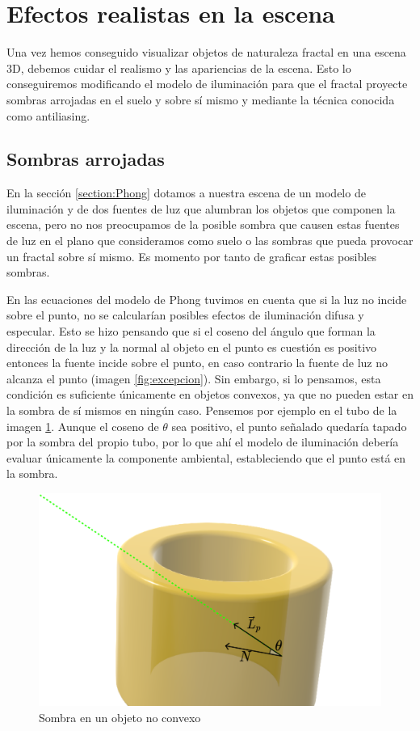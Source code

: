 \section{Efectos realistas en la escena}

Una vez hemos conseguido visualizar objetos de naturaleza fractal en una escena 3D, debemos cuidar el realismo y las apariencias de la escena. Esto lo conseguiremos modificando el modelo de iluminación para que el fractal proyecte sombras arrojadas en el suelo y sobre sí mismo y mediante la técnica conocida como antiliasing.

\subsection{Sombras arrojadas}
\label{subsection:sombras}

En la sección \ref{section:Phong} dotamos a nuestra escena de un modelo de iluminación y de dos fuentes de luz que alumbran los objetos que componen la escena, pero no nos preocupamos de la posible sombra que causen estas fuentes de luz en el plano que consideramos como suelo o las sombras que pueda provocar un fractal sobre sí mismo. Es momento por tanto de graficar estas posibles sombras.

En las ecuaciones del modelo de Phong tuvimos en cuenta que si la luz no incide sobre el punto, no se calcularían posibles efectos de iluminación difusa y especular. Esto se hizo pensando que si el coseno del ángulo que forman la dirección de la luz y la normal al objeto en el punto es cuestión es positivo entonces la fuente incide sobre el punto, en caso contrario la fuente de luz no alcanza el punto (imagen \ref{fig:excepcion}). Sin embargo, si lo pensamos, esta condición es suficiente únicamente en objetos convexos, ya que no pueden estar en la sombra de sí mismos en ningún caso. Pensemos por ejemplo en el tubo de la imagen \ref{fig:objeto-no-convexo}. Aunque el coseno de $\theta$ sea positivo, el punto señalado quedaría tapado por la sombra del propio tubo, por lo que ahí el modelo de iluminación debería evaluar únicamente la componente ambiental, estableciendo que el punto está en la sombra.

\begin{figure} [ht]
    \centering
    \includegraphics[scale = 0.3]{img/C8/no-convexo.png}
    \caption{Sombra en un objeto no convexo}
    \label{fig:objeto-no-convexo}
\end{figure}

